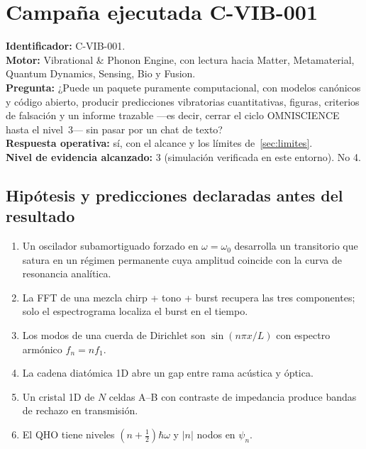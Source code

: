 \documentclass[11pt,a4paper]{article}
\begin{document}
\section{Campaña ejecutada C-VIB-001}
\label{sec:campana}

\begin{evibox}
\noindent\textbf{Identificador:} C-VIB-001.\\
\textbf{Motor:} Vibrational \& Phonon Engine, con lectura hacia Matter, Metamaterial, Quantum Dynamics, Sensing, Bio y Fusion.\\
\textbf{Pregunta:} ¿Puede un paquete puramente computacional, con modelos canónicos y código abierto, producir predicciones vibratorias cuantitativas, figuras, criterios de falsación y un informe trazable ---es decir, cerrar el ciclo OMNISCIENCE hasta el nivel~3--- sin pasar por un chat de texto?\\
\textbf{Respuesta operativa:} sí, con el alcance y los límites de~\cref{sec:limites}.\\
\textbf{Nivel de evidencia alcanzado:} 3 (simulación verificada en este entorno). No 4.
\end{evibox}

\subsection{Hipótesis y predicciones declaradas antes del resultado}

\begin{enumerate}[label=H\arabic*.]
    \item Un oscilador subamortiguado forzado en $\omega=\omega_0$ desarrolla un transitorio que satura en un régimen permanente cuya amplitud coincide con la curva de resonancia analítica.
    \item La FFT de una mezcla chirp + tono + burst recupera las tres componentes; solo el espectrograma localiza el burst en el tiempo.
    \item Los modos de una cuerda de Dirichlet son $\sin(n\pi x/L)$ con espectro armónico $f_n=nf_1$.
    \item La cadena diatómica 1D abre un gap entre rama acústica y óptica.
    \item Un cristal 1D de $N$ celdas A--B con contraste de impedancia produce bandas de rechazo en transmisión.
    \item El QHO tiene niveles $(n+\tfrac12)\hbar\omega$ y $|n|$ nodos en $\psi_n$.
\end{enumerate}
\end{document}
